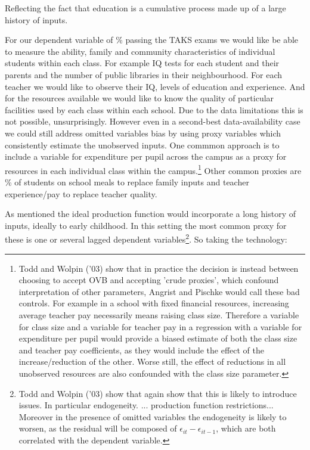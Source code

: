 \documentclass[11pt]{article}
\begin{document}
Reflecting the fact that education is a cumulative process made up of a large history of inputs. 

For our dependent variable of \% passing the TAKS exams we would like be able to measure the ability, family and community characteristics of individual students within each class. For example IQ tests for each student and their parents and the number of public libraries in their neighbourhood. For each teacher we would like to observe their IQ, levels of education and experience. And for the resources available we would like to know the quality of particular facilities used by each class within each school. Due to the data limitations this is not possible, unsurprisingly. However even in a second-best data-availability case we could still address omitted variables bias by using proxy variables which consistently estimate the unobserved inputs. One commmon approach is to include a variable for expenditure per pupil across the campus as a proxy for resources in each individual class within the campus.\footnote{Todd and Wolpin ('03) show that in practice the decision is instead between choosing to accept OVB and accepting 'crude proxies', which confound interpretation of other parameters, Angrist and Pischke would call these bad controls. For example in a school with fixed financial resources, increasing average teacher pay necessarily means raising class size. Therefore a variable for class size and a variable for teacher pay in a regression with a variable for expenditure per pupil would provide a biased estimate of both the class size and teacher pay coefficients, as they would include the effect of the increase/reduction of the other. Worse still, the effect of reductions in all unobserved resources are also confounded with the class size parameter.} Other common proxies are \% of students on school meals to replace family inputs and teacher experience/pay to replace teacher quality.  

As mentioned the ideal production function would incorporate a long history of inputs, ideally to early childhood. In this setting the most common proxy for these is one or several lagged dependent variables\footnote{Todd and Wolpin ('03) show that again show that this is likely to introduce issues. In particular endogeneity. ... production function restrictions... Moreover in the presence of omitted variables the endogeneity is likely to worsen, as the residual will be composed of $\epsilon_{it}-\epsilon_{it-1}$, which are both correlated with the dependent variable.}. So taking the technology: 
\end{document}
